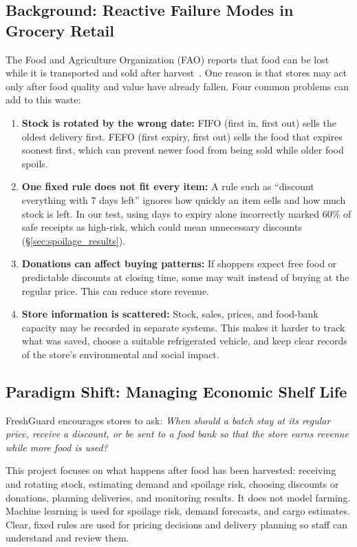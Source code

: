 \documentclass[12pt,a4paper]{article}
\renewcommand{\_}{\oldunderscore\allowbreak}
\begin{document}
\subsection{Background: Reactive Failure Modes in Grocery Retail}
The Food and Agriculture Organization (FAO) reports that food can be lost while it is transported and sold after harvest~\cite{fao2019}. One reason is that stores may act only after food quality and value have already fallen. Four common problems can add to this waste:
\begin{enumerate}[leftmargin=18pt, itemsep=2pt]
    \item \textbf{Stock is rotated by the wrong date:} FIFO (first in, first out) sells the oldest delivery first. FEFO (first expiry, first out) sells the food that expires soonest first, which can prevent newer food from being sold while older food spoils.
    \item \textbf{One fixed rule does not fit every item:} A rule such as “discount everything with 7 days left” ignores how quickly an item sells and how much stock is left. In our test, using days to expiry alone incorrectly marked 60\% of safe receipts as high-risk, which could mean unnecessary discounts (§\ref{sec:spoilage_results}).
    \item \textbf{Donations can affect buying patterns:} If shoppers expect free food or predictable discounts at closing time, some may wait instead of buying at the regular price. This can reduce store revenue.
    \item \textbf{Store information is scattered:} Stock, sales, prices, and food-bank capacity may be recorded in separate systems. This makes it harder to track what was saved, choose a suitable refrigerated vehicle, and keep clear records of the store's environmental and social impact.
\end{enumerate}

\subsection{Paradigm Shift: Managing Economic Shelf Life}
FreshGuard encourages stores to ask: \emph{When should a batch stay at its regular price, receive a discount, or be sent to a food bank so that the store earns revenue while more food is used?}

This project focuses on what happens after food has been harvested: receiving and rotating stock, estimating demand and spoilage risk, choosing discounts or donations, planning deliveries, and monitoring results. It does not model farming. Machine learning is used for spoilage risk, demand forecasts, and cargo estimates. Clear, fixed rules are used for pricing decisions and delivery planning so staff can understand and review them.
\end{document}
